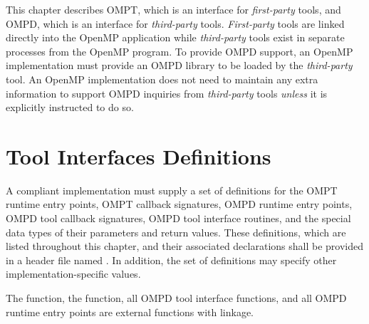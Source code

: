 This chapter describes OMPT, which is an interface for \emph{first-party} tools,
and OMPD, which is an interface for \emph{third-party} tools.
\emph{First-party} tools are linked directly into the OpenMP application
while \emph{third-party} tools exist in separate processes from the OpenMP program.
To provide OMPD support, an OpenMP implementation must provide an OMPD library to 
be loaded by the \emph{third-party} tool. An OpenMP implementation does not need 
to maintain any extra information to support OMPD inquiries from \emph{third-party} 
tools \emph{unless} it is explicitly instructed to do so.

\section{Tool Interfaces Definitions}
\label{sec:tool_interfaces_definitions}

\begin{ccppspecific}
A compliant implementation must supply a set of definitions for the OMPT runtime 
entry points, OMPT callback signatures, OMPD runtime entry points, OMPD tool 
callback signatures, OMPD tool interface routines, and the special data types of 
their parameters and return values. These definitions, which are listed throughout
this chapter, and their associated declarations shall be provided in a header file 
named . In addition, the set of definitions may specify other 
implementation-specific values.

The  function, the  function, 
all OMPD tool interface functions, and all OMPD runtime entry points are 
external functions with  linkage.
\end{ccppspecific}







